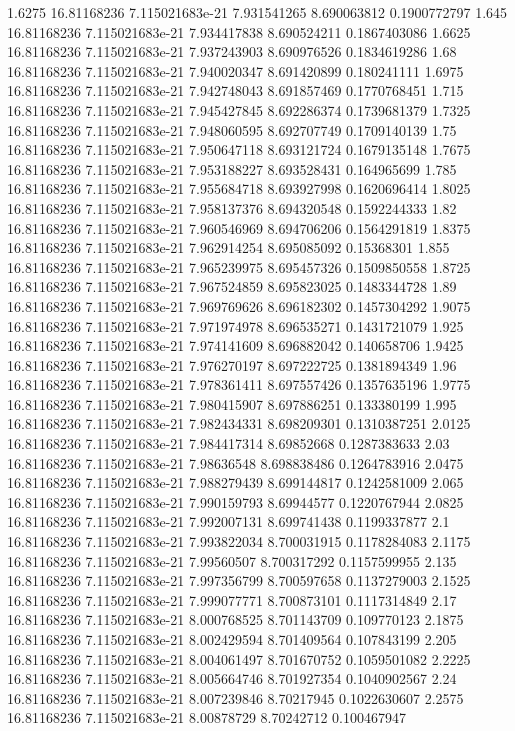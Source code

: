 {1.6275 16.81168236 7.115021683e-21 7.931541265 8.690063812 0.1900772797
1.645 16.81168236 7.115021683e-21 7.934417838 8.690524211 0.1867403086
1.6625 16.81168236 7.115021683e-21 7.937243903 8.690976526 0.1834619286
1.68 16.81168236 7.115021683e-21 7.940020347 8.691420899 0.180241111
1.6975 16.81168236 7.115021683e-21 7.942748043 8.691857469 0.1770768451
1.715 16.81168236 7.115021683e-21 7.945427845 8.692286374 0.1739681379
1.7325 16.81168236 7.115021683e-21 7.948060595 8.692707749 0.1709140139
1.75 16.81168236 7.115021683e-21 7.950647118 8.693121724 0.1679135148
1.7675 16.81168236 7.115021683e-21 7.953188227 8.693528431 0.164965699
1.785 16.81168236 7.115021683e-21 7.955684718 8.693927998 0.1620696414
1.8025 16.81168236 7.115021683e-21 7.958137376 8.694320548 0.1592244333
1.82 16.81168236 7.115021683e-21 7.960546969 8.694706206 0.1564291819
1.8375 16.81168236 7.115021683e-21 7.962914254 8.695085092 0.15368301
1.855 16.81168236 7.115021683e-21 7.965239975 8.695457326 0.1509850558
1.8725 16.81168236 7.115021683e-21 7.967524859 8.695823025 0.1483344728
1.89 16.81168236 7.115021683e-21 7.969769626 8.696182302 0.1457304292
1.9075 16.81168236 7.115021683e-21 7.971974978 8.696535271 0.1431721079
1.925 16.81168236 7.115021683e-21 7.974141609 8.696882042 0.140658706
1.9425 16.81168236 7.115021683e-21 7.976270197 8.697222725 0.1381894349
1.96 16.81168236 7.115021683e-21 7.978361411 8.697557426 0.1357635196
1.9775 16.81168236 7.115021683e-21 7.980415907 8.697886251 0.133380199
1.995 16.81168236 7.115021683e-21 7.982434331 8.698209301 0.1310387251
2.0125 16.81168236 7.115021683e-21 7.984417314 8.69852668 0.1287383633
2.03 16.81168236 7.115021683e-21 7.98636548 8.698838486 0.1264783916
2.0475 16.81168236 7.115021683e-21 7.988279439 8.699144817 0.1242581009
2.065 16.81168236 7.115021683e-21 7.990159793 8.69944577 0.1220767944
2.0825 16.81168236 7.115021683e-21 7.992007131 8.699741438 0.1199337877
2.1 16.81168236 7.115021683e-21 7.993822034 8.700031915 0.1178284083
2.1175 16.81168236 7.115021683e-21 7.99560507 8.700317292 0.1157599955
2.135 16.81168236 7.115021683e-21 7.997356799 8.700597658 0.1137279003
2.1525 16.81168236 7.115021683e-21 7.999077771 8.700873101 0.1117314849
2.17 16.81168236 7.115021683e-21 8.000768525 8.701143709 0.109770123
2.1875 16.81168236 7.115021683e-21 8.002429594 8.701409564 0.107843199
2.205 16.81168236 7.115021683e-21 8.004061497 8.701670752 0.1059501082
2.2225 16.81168236 7.115021683e-21 8.005664746 8.701927354 0.1040902567
2.24 16.81168236 7.115021683e-21 8.007239846 8.70217945 0.1022630607
2.2575 16.81168236 7.115021683e-21 8.00878729 8.70242712 0.100467947
}
